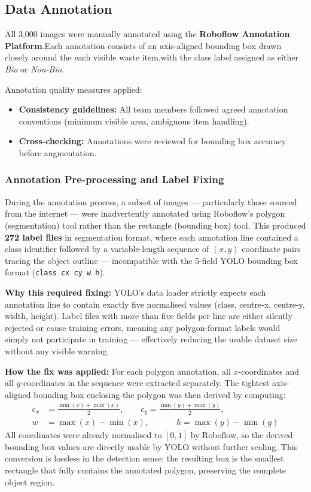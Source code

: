 \subsection{Data Annotation}

All 3,000 images were manually annotated using the \textbf{Roboflow Annotation Platform}.Each annotation consists of an axis-aligned bounding box drawn closely around the each visible waste item,with the class label assigned as either \textit{Bio} or \textit{Non-Bio}.

Annotation quality measures applied:
\begin{itemize}
    \item \textbf{Consistency guidelines:} All team members followed agreed annotation conventions (minimum visible area, ambiguous item handling).
    \item \textbf{Cross-checking:} Annotations were reviewed for bounding box accuracy before augmentation.
\end{itemize}

\subsubsection{Annotation Pre-processing and Label Fixing}

During the annotation process, a subset of images — particularly those sourced from the internet — were inadvertently annotated using Roboflow's polygon (segmentation) tool rather than the rectangle (bounding box) tool. This produced \textbf{272 label files} in segmentation format, where each annotation line contained a class identifier followed by a variable-length sequence of $(x, y)$ coordinate pairs tracing the object outline — incompatible with the 5-field YOLO bounding box format (\texttt{class cx cy w h}).

\textbf{Why this required fixing:} YOLO's data loader strictly expects each annotation line to contain exactly five normalised values (class, centre-x, centre-y, width, height). Label files with more than five fields per line are either silently rejected or cause training errors, meaning any polygon-format labels would simply not participate in training — effectively reducing the usable dataset size without any visible warning.

\textbf{How the fix was applied:} For each polygon annotation, all $x$-coordinates and all $y$-coordinates in the sequence were extracted separately. The tightest axis-aligned bounding box enclosing the polygon was then derived by computing:
\begin{equation}
\begin{aligned}
c_x &= \frac{\min(x) + \max(x)}{2}, \qquad
c_y = \frac{\min(y) + \max(y)}{2}, \\[6pt]
w   &= \max(x) - \min(x), \qquad\quad\;
h   = \max(y) - \min(y)
\end{aligned}
\end{equation}
All coordinates were already normalised to $[0, 1]$ by Roboflow, so the derived bounding box values are directly usable by YOLO without further scaling. This conversion is lossless in the detection sense: the resulting box is the smallest rectangle that fully contains the annotated polygon, preserving the complete object region.

